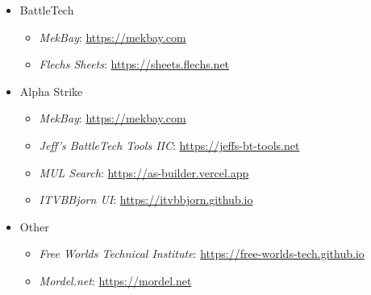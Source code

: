 \begin{itemize}

  \item BattleTech

  \begin{itemize}

    \item \emph{MekBay}: \href{https://mekbay.com}{https://mekbay.com}

    \item \emph{Flechs Sheets}: \href{https://sheets.flechs.net}{https://sheets.flechs.net}

  \end{itemize}

  \item Alpha Strike

  \begin{itemize}

    \item \emph{MekBay}: \href{https://mekbay.com}{https://mekbay.com}

    \item \emph{Jeff's BattleTech Tools IIC}: \href{https://jeffs-bt-tools.net}{https://jeffs-bt-tools.net}

    \item \emph{MUL Search}: \href{https://as-builder.vercel.app}{https://as-builder.vercel.app}

    \item \emph{ITVBBjorn UI}: \href{https://itvbbjorn.github.io}{https://itvbbjorn.github.io}

  \end{itemize}

  \item Other

  \begin{itemize}

    \item \emph{Free Worlds Technical Institute}: \href{https://free-worlds-tech.github.io}{https://free-worlds-tech.github.io}

    \item \emph{Mordel.net}: \href{https://mordel.net}{https://mordel.net}

  \end{itemize}

\end{itemize}
